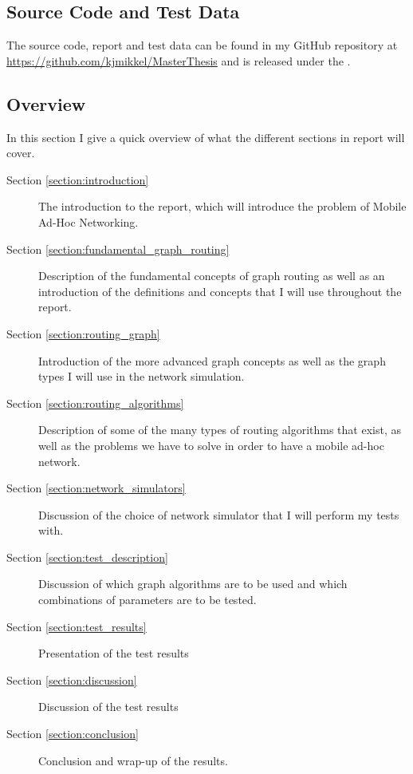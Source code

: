 
\subsection{Source Code and Test Data}
\label{section:source_code}
The source code, report and test data can be found in my GitHub repository at \url{https://github.com/kjmikkel/MasterThesis} and is released under the .

\subsection{Overview}
In this section I give a quick overview of what the different sections in report will cover.
\begin{description}
\item[Section \ref{section:introduction}] The introduction to the report, which will introduce the problem of Mobile Ad-Hoc Networking.
\item[Section \ref{section:fundamental_graph_routing}] Description of the fundamental concepts of graph routing as well as an introduction of the definitions and concepts that I will use throughout the report.
\item[Section \ref{section:routing_graph}] Introduction of the more advanced graph concepts as well as the graph types I will use in the network simulation.
\item[Section \ref{section:routing_algorithms}] Description of some of the many types of routing algorithms that exist, as well as the problems we have to solve in order to have a mobile ad-hoc network.
\item[Section \ref{section:network_simulators}] Discussion of the choice of network simulator that I will perform my tests with. 
\item[Section \ref{section:test_description}] Discussion of which graph algorithms are to be used and which combinations of parameters are to be tested.
\item[Section \ref{section:test_results}] Presentation of the test results
\item[Section \ref{section:discussion}] Discussion of the test results
\item[Section \ref{section:conclusion}] Conclusion and wrap-up of the results.
\end{description}
